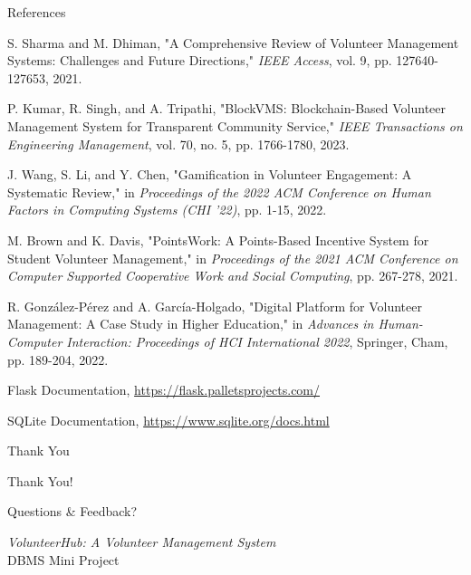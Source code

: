 \documentclass{beamer}
\begin{document}
\begin{frame}{References}
  \scriptsize
  \begin{thebibliography}{9}
     S. Sharma and M. Dhiman, "A Comprehensive Review of Volunteer Management Systems: Challenges and Future Directions," \textit{IEEE Access}, vol. 9, pp. 127640-127653, 2021.
    
     P. Kumar, R. Singh, and A. Tripathi, "BlockVMS: Blockchain-Based Volunteer Management System for Transparent Community Service," \textit{IEEE Transactions on Engineering Management}, vol. 70, no. 5, pp. 1766-1780, 2023.
    
     J. Wang, S. Li, and Y. Chen, "Gamification in Volunteer Engagement: A Systematic Review," in \textit{Proceedings of the 2022 ACM Conference on Human Factors in Computing Systems (CHI '22)}, pp. 1-15, 2022.
    
     M. Brown and K. Davis, "PointsWork: A Points-Based Incentive System for Student Volunteer Management," in \textit{Proceedings of the 2021 ACM Conference on Computer Supported Cooperative Work and Social Computing}, pp. 267-278, 2021.

     R. González-Pérez and A. García-Holgado, "Digital Platform for Volunteer Management: A Case Study in Higher Education," in \textit{Advances in Human-Computer Interaction: Proceedings of HCI International 2022}, Springer, Cham, pp. 189-204, 2022.
    
     Flask Documentation, \url{https://flask.palletsprojects.com/}
    
     SQLite Documentation, \url{https://www.sqlite.org/docs.html}
    
  \end{thebibliography}
\end{frame}

\begin{frame}[plain]{Thank You}
  \begin{center}
    \Huge Thank You!
    
    \vspace{1cm}
    \Large Questions \& Feedback?
    
    \vspace{1.5cm}
    \normalsize
    \textit{VolunteerHub: A Volunteer Management System}\\
    DBMS Mini Project
  \end{center}
\end{frame}
\end{document}

